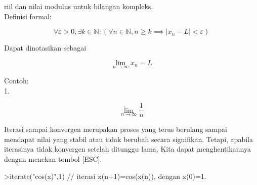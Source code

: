 \documentclass[a4paper,10pt]{article}
\begin{document}
\begin{eulernotebook}
\begin{eulercomment}
\begin{eulercomment}
\begin{eulercomment}
\begin{eulercomment}
\begin{eulercomment}
\begin{eulercomment}
\begin{eulercomment}
\begin{eulercomment}
\begin{eulercomment}
\begin{eulercomment}
\begin{eulercomment}
\begin{eulercomment}
\begin{eulercomment}
\begin{eulercomment}
\begin{eulercomment}
\begin{eulercomment}
\begin{eulercomment}
\begin{eulercomment}
\begin{eulercomment}
\begin{eulercomment}
\begin{eulercomment}
\begin{eulercomment}
\begin{eulercomment}
\begin{eulercomment}
\begin{eulercomment}
\begin{eulercomment}
\begin{eulercomment}
riil dan nilai modulus  untuk bilangan kompleks.\\
Definisi formal:\\
\end{eulercomment}
\begin{eulerformula}
\[
\forall \varepsilon > 0, \exists k \in \mathbb{N} : (\forall n \in \mathbb{N}, n \geq k \implies |x_n - L| <\varepsilon)
\]
\end{eulerformula}
\begin{eulercomment}
Dapat dinotasikan sebagai\\
\end{eulercomment}
\begin{eulerformula}
\[
\lim_{n \to \infty}x_n=L
\]
\end{eulerformula}
\begin{eulercomment}
Contoh:\\
1.\\
\end{eulercomment}
\begin{eulerformula}
\[
\lim_{n \to \infty}\frac{1}{n}
\]
\end{eulerformula}
\begin{eulercomment}
\begin{eulercomment}
\begin{eulercomment}
Iterasi sampai konvergen merupakan proses yang terus berulang sampai
mendapat nilai yang stabil atau tidak berubah secara signifikan.
Tetapi, apabila iterasinya tidak konvergen setelah ditunggu lama, Kita
dapat menghentikannya dengan menekan tombol [ESC].
\end{eulercomment}
\begin{eulerprompt}
>iterate("cos(x)",1) // iterasi x(n+1)=cos(x(n)), dengan x(0)=1.
\end{eulerprompt}

\end{eulercomment}
\end{eulercomment}
\end{eulercomment}
\end{eulercomment}
\end{eulercomment}
\end{eulercomment}
\end{eulercomment}
\end{eulercomment}
\end{eulercomment}
\end{eulercomment}
\end{eulercomment}
\end{eulercomment}
\end{eulercomment}
\end{eulercomment}
\end{eulercomment}
\end{eulercomment}
\end{eulercomment}
\end{eulercomment}
\end{eulercomment}
\end{eulercomment}
\end{eulercomment}
\end{eulercomment}
\end{eulercomment}
\end{eulercomment}
\end{eulercomment}
\end{eulercomment}
\end{eulercomment}
\end{eulercomment}
\end{eulernotebook}
\end{document}
